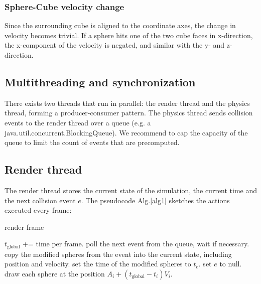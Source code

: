 \documentclass[journal, letterpaper]{IEEEtran}
\begin{document}
\subsubsection{Sphere-Cube velocity change}\label{SCV}
Since the surrounding cube is aligned to the coordinate axes, the change in velocity becomes trivial. If a sphere hits one of the two cube faces in x-direction, the x-component of the velocity is negated, and similar with the y- and z-direction.

\subsection{Multithreading and synchronization}
There exists two threads that run in parallel: the render thread and the physics thread, forming a producer-consumer pattern. The physics thread sends collision events to the render thread over a queue (e.g. a java.util.concurrent.BlockingQueue). We recommend to cap the capacity of the queue to limit the count of events that are precomputed.

\subsection{Render thread}
The render thread stores the current state of the simulation, the current time and the next collision event $e$.
The pseudocode Alg.\ref{alg1} sketches the actions executed every frame:
\begin{algorithm}
\caption{render frame}
\label{alg1}
\begin{algorithmic}
	\STATE $t_\text{global}$ += time per frame.
	\REPEAT
			\STATE poll the next event from the queue, wait if necessary.
		\ENDIF
			\STATE copy the modified spheres from the event into the current state, including position and velocity.
			\STATE set the time of the modified spheres to $t_e$.
			\STATE set $e$ to null.
		\ENDIF
	\STATE draw each sphere at the position $A_i + (t_\text{global}-t_i)V_i$.
\end{algorithmic}
\end{algorithm}
\end{document}
